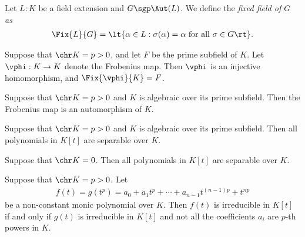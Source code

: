 \documentclass[a4paper]{article}
\begin{document}
\begin{tdefinition}
  Let \( L:K \) be a field extension and \( G \sgp \Aut(L) \).
  We define the \it{fixed field of \( G \)} as \begin{align*}
    \Fix{L}{G} = \lt\{ \alpha\in L : \sigma(\alpha) = \alpha \text{ for all } \sigma\in G \rt\}.
  \end{align*}
\end{tdefinition}

\begin{ttheorem}
  Suppose that \( \chr K = p>0 \), and let \( F \) be the prime subfield of \( K \).
  Let \( \vphi:K\to K \) denote the Frobenius map.
  Then \( \vphi \) is an injective homomorphism, and \( \Fix{\vphi}{K} = F \).
\end{ttheorem}

\begin{tcorollary}
  Suppose that \( \chr K = p > 0 \) and \( K \) is algebraic over its prime subfield.
  Then the Frobenius map is an automorphism of \( K \).
\end{tcorollary}

\begin{tcorollary}
  Suppose that \( \chr K = p > 0 \) and \( K \) is algebraic over its prime subfield.
  Then all polynomials in \( K[t] \) are separable over \( K \).
\end{tcorollary}

\begin{tcorollary}[**]
  Suppose that \( \chr K = 0 \).
  Then all polynomials in \( K[t] \) are separable over \( K \).
\end{tcorollary}

\begin{ttheorem}
  Suppose that \( \chr K = p > 0 \). Let \begin{align*}
    f(t) = g(t^p) = a_0+a_1t^p+\cdots+a_{n-1}t^{(n-1)p}+t^{np}
  \end{align*}
  be a non-constant monic polynomial over \( K \).
  Then \( f(t) \) is irreducible in \( K[t] \) if and only if \( g(t) \) is irreducible in \( K[t] \) and not all the coefficients \( a_i \) are \( p \)-th powers in \( K \).
\end{ttheorem}
\end{document}
